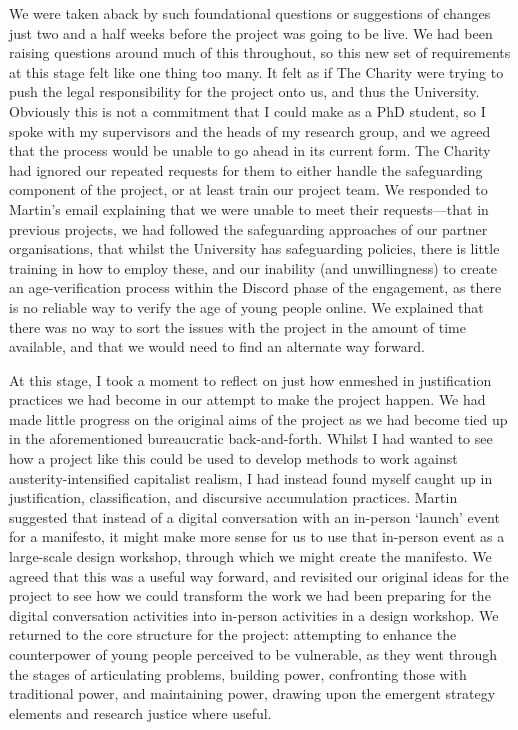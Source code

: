 We were taken aback by such foundational questions or suggestions of changes just two and a half weeks before the project was going to be live. We had been raising questions around much of this throughout, so this new set of requirements at this stage felt like one thing too many. It felt as if The Charity were trying to push the legal responsibility for the project onto us, and thus the University. Obviously this is not a commitment that I could make as a PhD student, so I spoke with my supervisors and the heads of my research group, and we agreed that the process would be unable to go ahead in its current form. The Charity had ignored our repeated requests for them to either handle the safeguarding component of the project, or at least train our project team. We responded to Martin's email explaining that we were unable to meet their requests—that in previous projects, we had followed the safeguarding approaches of our partner organisations, that whilst the University has safeguarding policies, there is little training in how to employ these, and our inability (and unwillingness) to create an age-verification process within the Discord phase of the engagement, as there is no reliable way to verify the age of young people online. We explained that there was no way to sort the issues with the project in the amount of time available, and that we would need to find an alternate way forward. 

At this stage, I took a moment to reflect on just how enmeshed in justification practices we had become in our attempt to make the project happen. We had made little progress on the original aims of the project as we had become tied up in the aforementioned bureaucratic back-and-forth. Whilst I had wanted to see how a project like this could be used to develop methods to work against austerity-intensified capitalist realism, I had instead found myself caught up in justification, classification, and discursive accumulation practices. Martin suggested that instead of a digital conversation with an in-person `launch' event for a manifesto, it might make more sense for us to use that in-person event as a large-scale design workshop, through which we might create the manifesto. We agreed that this was a useful way forward, and revisited our original ideas for the project to see how we could transform the work we had been preparing for the digital conversation activities into in-person activities in a design workshop. We returned to the core structure for the project: attempting to enhance the counterpower of young people perceived to be vulnerable, as they went through the stages of articulating problems, building power, confronting those with traditional power, and maintaining power, drawing upon the emergent strategy elements and research justice where useful. 


